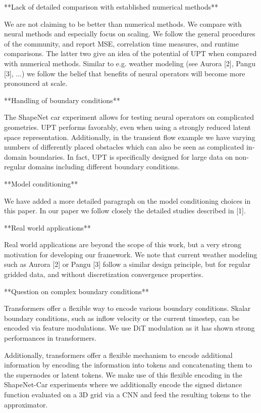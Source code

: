 **Lack of detailed comparison with established numerical methods**

We are not claiming to be better than numerical methods. We compare with neural methods and especially focus on scaling. We follow the general procedures of the community, and report MSE, correlation time measures, and runtime comparisons. The latter two give an idea of the potential of UPT when compared with numerical methods. Similar to e.g. weather modeling (see Aurora [2], Pangu [3], ...) we follow the belief that benefits of neural operators will become more pronounced at scale.

**Handling of boundary conditions**

The ShapeNet car experiment allows for testing neural operators on complicated geometries. UPT performs favorably, even when using a strongly reduced latent space representation. Additionally, in the transient flow example we have varying numbers of differently placed obstacles which can also be seen as complicated in-domain boundaries. In fact, UPT is specifically designed for large data on non-regular domains including different boundary conditions.

**Model conditioning**

We have added a more detailed paragraph on the model conditioning choices in this paper. In our paper we follow closely the detailed studies described in [1].

**Real world applications**

Real world applications are beyond the scope of this work, but a very strong motivation for developing our framework. We note that current weather modeling such as Aurora [2] or Pangu [3] follow a similar design principle, but for regular gridded data, and without discretization convergence properties.

**Question on complex boundary conditions**

Transformers offer a flexible way to encode various boundary conditions.
Skalar boundary conditions, such as inflow velocity or the current timestep, can be encoded via feature modulations. We use DiT modulation as it has shown strong performances in transformers.

Additionally, transformers offer a flexible mechanism to encode additional information by encoding the information into tokens and concatenating them to the supernodes or latent tokens. We make use of this flexible encoding in the ShapeNet-Car experiments where we additionally encode the signed distance function evaluated on a 3D grid via a CNN and feed the resulting tokens to the approximator.

